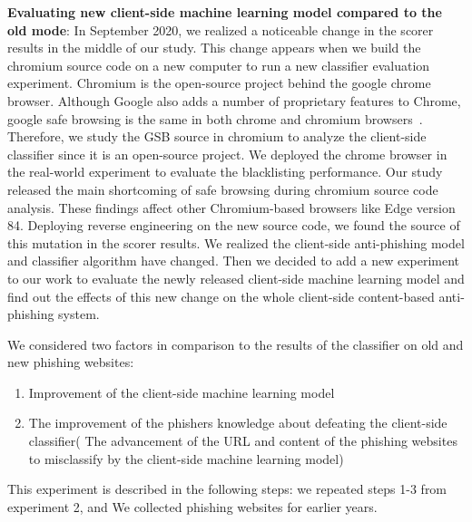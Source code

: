 \textbf{Evaluating new client-side machine learning model compared to the old mode}:
In September 2020, we realized a noticeable change in the scorer results in the middle of our study. This change appears when we build the chromium source code on a new computer to run a new classifier evaluation experiment.
Chromium is the open-source project behind the google chrome browser. Although Google also adds a number of proprietary features to Chrome, google safe browsing is the same in both chrome and chromium browsers~\cite{the-chromium-projects}. Therefore, we study the GSB source in chromium to analyze the client-side classifier since it is an open-source project. We deployed the chrome browser in the real-world experiment to evaluate the blacklisting performance. Our study released the main shortcoming of safe browsing during chromium source code analysis. These findings affect other Chromium-based browsers like  Edge version 84.
Deploying reverse engineering on the new source code, we found the source of this mutation in the scorer results. We realized the client-side anti-phishing model and classifier algorithm have changed. Then we decided to add a new experiment to our work to evaluate the newly released client-side machine learning model and find out the effects of this new change on the whole client-side content-based anti-phishing system. 

We considered two factors in comparison to the results of the classifier on old and new phishing websites:
\begin{enumerate}
    \item Improvement of the client-side machine learning model
    \item The improvement of the phishers knowledge about defeating the client-side classifier( The advancement of the URL and content of the phishing websites to misclassify by the client-side machine learning model)
\end{enumerate}

This experiment is described in the following steps: we repeated steps 1-3 from experiment 2, and We collected phishing websites for earlier years.

